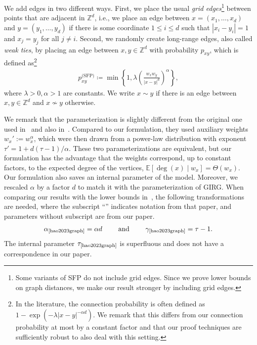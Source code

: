 \documentclass[11pt, letterpaper, margin=1in]{amsart}
\theoremstyle{definition}
\theoremstyle{remark}
\newcommand{\Expected}[1]{\ensuremath{ \mathbb{E} \left[ #1 \right] } }
\newcommand{\ZZ}{\mathbb{Z}}
\newcommand{\pSFP}{\ensuremath{ p_{xy}^{\text{(SFP)}} }}
\numberwithin{equation}{section}
\begin{document}
We add edges in two different ways. First, we place the usual \emph{grid edges}\footnote{Some variants of SFP do not include grid edges. Since we prove lower bounds on graph distances, we make our result stronger by including grid edges.} between points that are adjacent in $\mathbb{Z}^d$, i.e., we place an edge between $x = (x_1, \ldots, x_d)$ and $y = (y_1, \ldots, y_d)$ if there is some coordinate $1 \le i \le d$ such that $|x_i - y_i| = 1$ and $x_j = y_j$ for all $j \neq i$. Second, we randomly create long-range edges, also called \emph{weak ties}, by placing an edge between $x, y \in \mathbb{Z}^d$ with probability $p_{xy}$, which is defined as\footnote{In the literature, the connection probability is often defined as $1 - \exp( - \lambda |x- y|^{-\alpha d} )$. We remark that this differs from our connection probability at most by a constant factor and that our proof techniques are sufficiently robust to also deal with this setting. } 
\begin{align}\label{eq:SFP}
    \pSFP \coloneqq \min\left\{ 1 , \lambda \left( \frac{w_xw_y}{|x - y|^{ d}} \right)^\alpha \right\},
\end{align}
where $\lambda > 0, \alpha > 1$ are constants. We write $x \sim y$ if there is an edge between $x, y \in \ZZ^d$ and $x \nsim y$ otherwise. 

We remark that the parameterization is slightly different from the original one used in~\cite{deijfen2013scale} and also in~\cite{hao2023graph}. Compared to our formulation, they used auxiliary weights $w_x' := w_x^\alpha$, which were then drawn from a power-law distribution with exponent $\tau' = 1+d(\tau-1)/\alpha$. These two parameterizations are equivalent, but our formulation has the advantage that the weights correspond, up to constant factors, to the expected degree of the vertices, $\Expected{\deg(x) \mid w_x} = \Theta(w_x)$. Our formulation also saves an internal parameter of the model. Moreover, we rescaled $\alpha$ by a factor $d$ to match it with the parameterization of GIRG. When comparing our results with the lower bounds in~\cite{hao2023graph}, the following transformations are needed, where the subscript ``\hspace{1sp}\cite{hao2023graph}'' indicates notation from that paper, and parameters without subscript are from our paper.
\begin{align}\label{eq:Hao_parameters}
    \alpha_{\text{\hspace{1sp}\cite{hao2023graph}}} = \alpha d \qquad\text{ and }\qquad \gamma_{\text{\hspace{1sp}\cite{hao2023graph}}} = \tau-1.
\end{align}
The internal parameter $\tau_{\text{\hspace{1sp}\cite{hao2023graph}}}$ is superfluous and does not have a correspondence in our paper.
\end{document}

